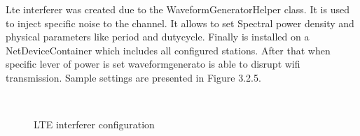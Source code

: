  \textnormal{\hspace{0.5cm}Lte interferer was created due to the WaveformGeneratorHelper class. It is used to inject specific noise to the channel. It allows to set Spectral power density and physical parameters like period and dutycycle. Finally is installed on a NetDeviceContainer which includes all configured stations. After that when specific lever of power is set waveformgenerato is able to disrupt wifi transmission. Sample settings are presented in Figure 3.2.5.} 
 \begin{center}
 	\begin{figure}[h]
 		\centering
 		\\
 		\caption{LTE interferer configuration}
 	\end{figure}
 \end{center}  
